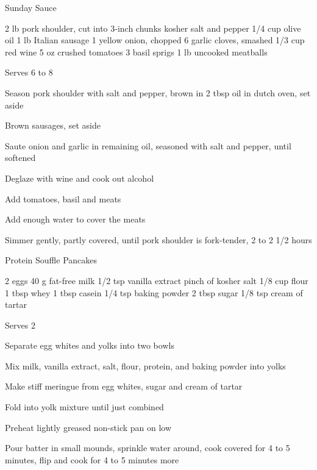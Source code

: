 \begin{denserecipe}{Sunday Sauce}{}
\begin{ingredients}
2 lb pork shoulder, cut into 3-inch chunks
kosher salt and pepper
1/4 cup olive oil
1 lb Italian sausage
1 yellow onion, chopped
6 garlic cloves, smashed
1/3 cup red wine
5 oz crushed tomatoes
3 basil sprigs
1 lb uncooked meatballs
\end{ingredients}
\nextcolumn
Serves 6 to 8
\begin{steps}
\item Season pork shoulder with salt and pepper, brown in 2 tbsp oil in dutch oven, set aside
\item Brown sausages, set aside
\item Saute onion and garlic in remaining oil, seasoned with salt and pepper, until softened
\item Deglaze with wine and cook out alcohol
\item Add tomatoes, basil and meats
\item Add enough water to cover the meats
\item Simmer gently, partly covered, until pork shoulder is fork-tender, 2 to 2 1/2 hours
\end{steps}
\end{denserecipe}

\begin{denserecipe}{Protein Souffle Pancakes}{}
\begin{ingredients}
2 eggs
40 g fat-free milk
1/2 tsp vanilla extract
pinch of kosher salt
1/8 cup flour
1 tbsp whey
1 tbsp casein
1/4 tsp baking powder
2 tbsp sugar
1/8 tsp cream of tartar
\end{ingredients}
\nextcolumn
Serves 2
\begin{steps}
\item Separate egg whites and yolks into two bowls
\item Mix milk, vanilla extract, salt, flour, protein, and baking powder into yolks
\item Make stiff meringue from egg whites, sugar and cream of tartar
\item Fold into yolk mixture until just combined
\item Preheat lightly greased non-stick pan on low
\item Pour batter in small mounds, sprinkle water around, cook covered for 4 to 5 minutes, flip and cook for 4 to 5 minutes more
\end{steps}
\end{denserecipe}

